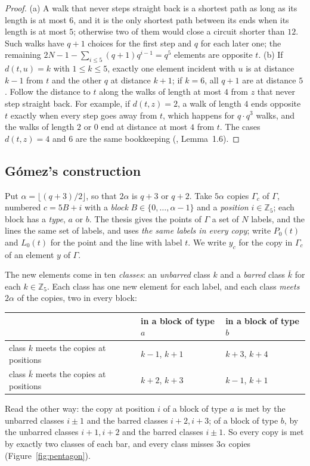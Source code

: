 \documentclass[11pt]{amsart}
\theoremstyle{definition}
\theoremstyle{remark}
\begin{document}
\begin{proof}
(a) A walk that never steps straight back is a shortest path as long as its length is at most $6$, and it is the only shortest path between its ends when its length is at most $5$; otherwise two of them would close a circuit shorter than $12$. Such walks have $q+1$ choices for the first step and $q$ for each later one; the remaining $2N-1-\sum_{i\le5}(q+1)q^{i-1}=q^5$ elements are opposite $t$. (b) If $d(t,u)=k$ with $1\le k\le5$, exactly one element incident with $u$ is at distance $k-1$ from $t$ and the other $q$ at distance $k+1$; if $k=6$, all $q+1$ are at distance $5$. Follow the distance to $t$ along the walks of length at most $4$ from $z$ that never step straight back. For example, if $d(t,z)=2$, a walk of length $4$ ends opposite $t$ exactly when every step goes away from $t$, which happens for $q\cdot q^3$ walks, and the walks of length $2$ or $0$ end at distance at most $4$ from $t$. The cases $d(t,z)=4$ and $6$ are the same bookkeeping (, Lemma~1.6).
\end{proof}

\subsection{G\'omez's construction}\label{ssec:gomez}
Put $\alpha=\lfloor(q+3)/2\rfloor$, so that $2\alpha$ is $q+3$ or $q+2$. Take $5\alpha$ copies $\Gamma_c$ of $\Gamma$, numbered $c=5B+i$ with a \emph{block} $B\in\{0,\dots,\alpha-1\}$ and a \emph{position} $i\in\mathbb{Z}_5$; each block has a \emph{type}, $a$ or $b$. The thesis gives the points of $\Gamma$ a set of $N$ labels, and the lines the same set of labels, and uses \emph{the same labels in every copy}; write $P_0(t)$ and $L_0(t)$ for the point and the line with label $t$. We write $y_c$ for the copy in $\Gamma_c$ of an element $y$ of $\Gamma$.

The new elements come in ten \emph{classes}: an \emph{unbarred} class $k$ and a \emph{barred} class $\bar k$ for each $k\in\mathbb{Z}_5$. Each class has one new element for each label, and each class \emph{meets} $2\alpha$ of the copies, two in every block:
\begin{center}\small
\renewcommand{\arraystretch}{1.15}
\begin{tabular}{@{}lll@{}}
\toprule
 & in a block of type $a$ & in a block of type $b$\\
\midrule
class $k$ meets the copies at positions & $k-1$, $k+1$ & $k+3$, $k+4$\\
class $\bar k$ meets the copies at positions & $k+2$, $k+3$ & $k-1$, $k+1$\\
\bottomrule
\end{tabular}
\end{center}
Read the other way: the copy at position $i$ of a block of type $a$ is met by the unbarred classes $i\pm1$ and the barred classes $i+2,i+3$; of a block of type $b$, by the unbarred classes $i+1,i+2$ and the barred classes $i\pm1$. So every copy is met by exactly two classes of each bar, and every class misses $3\alpha$ copies (Figure~\ref{fig:pentagon}).
\end{document}
